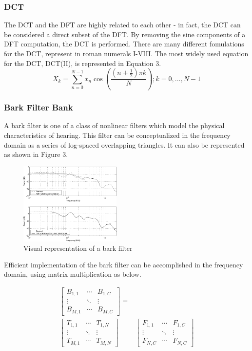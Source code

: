 \documentclass[journal]{IEEEtran}
\begin{document}
\subsubsection{DCT}
The DCT and the DFT are highly related to each other - in fact, the DCT can be considered a direct subset of the DFT. By removing the sine components
of a DFT computation, the DCT is performed. There are many different fomulations for the DCT, represent in roman numerals I-VIII. The most widely
used equation for the DCT, DCT(II), is represented in Equation 3. \cite{DSPBook}
\begin{equation}
X_k = \sum_{n=0}^{N-1}x_n\cos(\frac{(n + \frac{1}{2})\pi k}{N});k = 0,...,N-1
\end{equation}

\subsubsection{Bark Filter Bank}
A bark filter is one of a class of nonlinear filters which model the physical characteristics of hearing. This filter can be conceptualized in 
the frequency domain as a series of log-spaced overlapping triangles. It can also be represented as shown in Figure 3.
\begin{figure}[h!]
\centering
  \includegraphics[width=0.45\textwidth]{fig3.png}
\caption{Visual representation of a bark filter \cite{AudioBook}}
\end{figure}

Efficient implementation of the bark filter can be accomplished in the frequency domain, using matrix multiplication as below.
\begin{small}
\begin{align}
\begin{bmatrix}
B_{1,1} & \cdots & B_{1,C} \\
\vdots & \ddots & \vdots \\
B_{M,1} & \cdots & B_{M,C} 
\end{bmatrix} = \nonumber \\ 
\begin{bmatrix}
T_{1,1} & \cdots & T_{1,N} \\
\vdots & \ddots & \vdots \\
T_{M,1} & \cdots & T_{M,N}
\end{bmatrix} & 
\begin{bmatrix}
F_{1,1} & \cdots & F_{1,C} \\
\vdots & \ddots & \vdots \\
F_{N,C} & \cdots & F_{N,C}
\end{bmatrix} 
\end{align}
\end{small}
\end{document}
